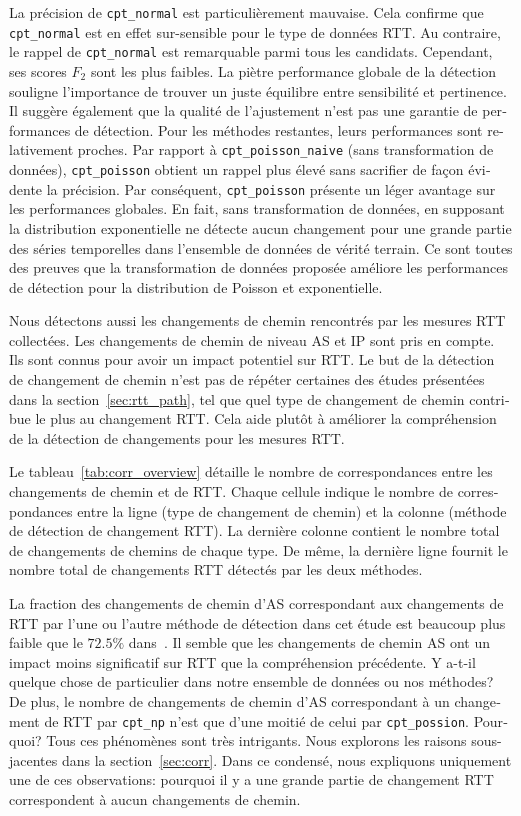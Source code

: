 \begin{otherlanguage}{french}
La précision de \texttt{cpt\_normal} est particulièrement mauvaise.
Cela confirme que \texttt{cpt\_normal} est en effet sur-sensible pour le type de données RTT.
Au contraire, le rappel de \texttt{cpt\_normal} est remarquable parmi tous les candidats.
Cependant, ses scores $F_2$ sont les plus faibles.
La piètre performance globale de la détection souligne l'importance de trouver un juste équilibre entre sensibilité et pertinence.
Il suggère également que la qualité de l'ajustement n'est pas une garantie de performances de détection.
Pour les méthodes restantes, leurs performances sont relativement proches.
Par rapport à \texttt{cpt\_poisson\_naive} (sans transformation de données), 
\texttt{cpt\_poisson} obtient un rappel plus élevé sans sacrifier de façon évidente la précision.
Par conséquent, \texttt{cpt\_poisson} présente un léger avantage sur les performances globales.
En fait, sans transformation de données, en supposant la distribution exponentielle ne détecte aucun changement pour une grande partie des séries temporelles dans l'ensemble de données de vérité terrain.
Ce sont toutes des preuves que la transformation de données proposée améliore les performances de détection pour la distribution de Poisson et exponentielle.

Nous détectons aussi les changements de chemin rencontrés par les mesures RTT collectées.
Les changements de chemin de niveau AS et IP sont pris en compte.
Ils sont connus pour avoir un impact potentiel sur RTT.
Le but de la détection de changement de chemin n'est pas de répéter certaines des études présentées dans la section~\ref{sec:rtt_path},
tel que quel type de changement de chemin contribue le plus au changement RTT.
Cela aide plutôt à améliorer la compréhension de la détection de changements pour les mesures RTT.

Le tableau~\ref{tab:corr_overview} détaille le nombre de correspondances entre les changements de chemin et de RTT.
Chaque cellule indique le nombre de correspondances entre la ligne (type de changement de chemin) et la colonne (méthode de détection de changement RTT).
La dernière colonne contient le nombre total de changements de chemins de chaque type.
De même, la dernière ligne fournit le nombre total de changements RTT détectés par les deux méthodes.

La fraction des changements de chemin d'AS correspondant aux changements de RTT par l'une ou l'autre méthode de détection dans cet étude 
est beaucoup plus faible que le $72.5\%$ dans~\cite{Rimondini2014}.
Il semble que les changements de chemin AS ont un impact moins significatif sur RTT que la compréhension précédente.
Y a-t-il quelque chose de particulier dans notre ensemble de données ou nos méthodes?
De plus, le nombre de changements de chemin d'AS correspondant à un changement de RTT par \texttt{cpt\_np} 
n'est que d'une moitié de celui par \texttt{cpt\_possion}. Pourquoi?
Tous ces phénomènes sont très intrigants.
Nous explorons les raisons sous-jacentes dans la section~\ref{sec:corr}.
Dans ce condensé, nous expliquons uniquement une de ces observations: pourquoi il y a une grande partie de changement RTT correspondent à aucun changements de chemin.


\end{otherlanguage}
